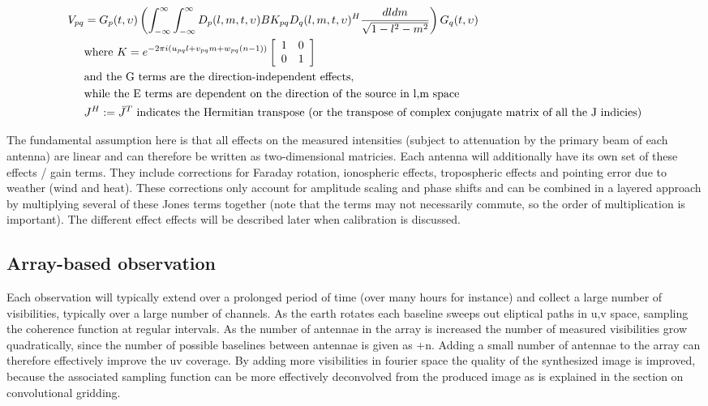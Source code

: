 \documentclass[a4paper,10pt]{report}
\begin{document}
\begin{equation}
\begin{split}
    V_{pq} &= G_p(t,\upsilon)\left(\int_{-\infty}^{\infty}\int_{-\infty}^{\infty}D_p(l,m,t,\upsilon)BK_{pq}D_q(l,m,t,\upsilon)^H\frac{dldm}{\sqrt{1-l^2-m^2}}\right)G_q(t,\upsilon)\\
	  &\text{where }K = e^{-2\pi i(u_{pq}l+v_{pq}m+w_{pq}(n-1))}
    \left[\begin{array}{c c}
     1 & 0 \\
     0 & 1 \\
    \end{array}\right]\\
	 &\text{and the G terms are the direction-independent effects,}\\
	 &\text{while the E terms are dependent on the direction of the source in l,m space}\\
 	 &J^H:=\bar J^T \text{ indicates the Hermitian transpose (or the transpose of complex conjugate matrix of all the J indicies)}\\ 
\end{split}
\end{equation}

The fundamental assumption here is that all effects on the measured intensities (subject to attenuation by the primary beam of each antenna) are linear and can therefore be written as two-dimensional matricies. Each antenna will additionally have its own set of these effects / gain terms. They include corrections for
Faraday rotation, ionospheric effects, tropospheric effects and pointing error due to weather (wind and heat). These corrections only account for amplitude scaling and phase shifts and can be combined in a layered approach by multiplying several of these 
Jones terms together (note that the terms may not necessarily commute, so the order of multiplication is important). The different effect effects will be described later when calibration is discussed.

\subsection{Array-based observation}
Each observation will typically extend over a prolonged period of time (over many hours for instance) and collect a large number of visibilities, typically over a large number of channels. As the earth rotates each baseline sweeps out
eliptical paths in u,v space, sampling the coherence function at regular intervals. As the number of antennae in the array is increased the number of measured visibilities grow quadratically, since the number of possible baselines between 
antennae is given as +n. Adding a small number of antennae to the array can therefore effectively improve the uv coverage. By adding more visibilities in fourier space the quality of the synthesized 
image is improved, because the associated sampling function can be more effectively deconvolved from the produced image as is explained in the section on convolutional gridding.
\end{document}
